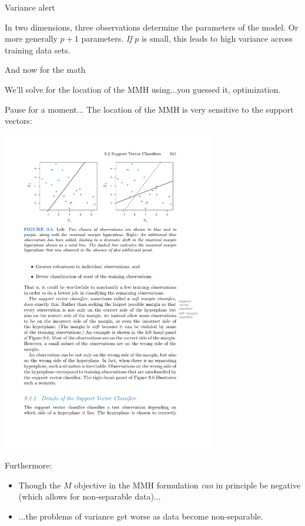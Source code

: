 \documentclass[mathserif, aspectratio=169]{beamer}
\begin{document}
\begin{frame}{Variance alert}

In two dimensions, three observations determine the parameters of the model.  Or more generally $p+1$ parameters.  \textit{If} $p$ is small, this leads to high variance across training data sets.   
\end{frame}

\begin{frame}{And now for the math}

We'll solve for the location of the MMH using...\pause you guessed it, optimization.  

\vspace{40mm}

\end{frame}

\begin{frame}{Pause for a moment...}
The location of the MMH is very sensitive to the support vectors:

\includegraphics[width=0.7\textwidth]{ISLR_9point5}

Furthermore:
\begin{itemize}
\item Though the $M$ objective in the MMH formulation \textit{can} in principle be negative (which allows for non-separable data)...
\item ...the problems of variance get worse as data become non-separable.
\end{itemize}
\end{frame}
\end{document}
